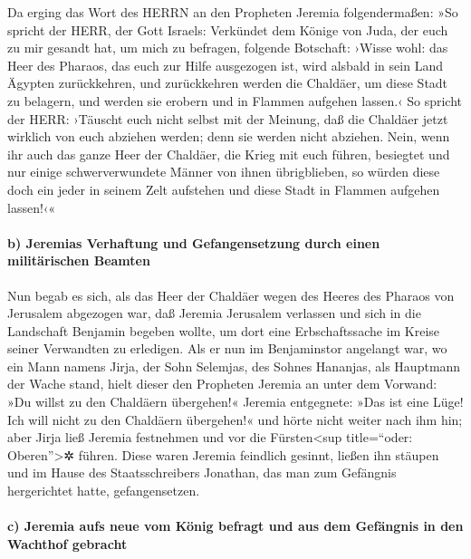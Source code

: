 Da erging das Wort des HERRN an den Propheten Jeremia
folgendermaßen: »So spricht der HERR, der Gott Israels:
Verkündet dem Könige von Juda, der euch zu mir gesandt hat, um mich zu
befragen, folgende Botschaft: ›Wisse wohl: das Heer des Pharaos, das
euch zur Hilfe ausgezogen ist, wird alsbald in sein Land Ägypten
zurückkehren, und zurückkehren werden die Chaldäer, um
diese Stadt zu belagern, und werden sie erobern und in Flammen aufgehen
lassen.‹ So spricht der HERR: ›Täuscht euch nicht selbst
mit der Meinung, daß die Chaldäer jetzt wirklich von euch abziehen
werden; denn sie werden nicht abziehen. Nein, wenn ihr
auch das ganze Heer der Chaldäer, die Krieg mit euch führen, besiegtet
und nur einige schwerverwundete Männer von ihnen übrigblieben, so würden
diese doch ein jeder in seinem Zelt aufstehen und diese Stadt in Flammen
aufgehen lassen!‹«

\hypertarget{b-jeremias-verhaftung-und-gefangensetzung-durch-einen-milituxe4rischen-beamten}{%
\paragraph{b) Jeremias Verhaftung und Gefangensetzung durch einen
militärischen
Beamten}\label{b-jeremias-verhaftung-und-gefangensetzung-durch-einen-milituxe4rischen-beamten}}

Nun begab es sich, als das Heer der Chaldäer wegen des
Heeres des Pharaos von Jerusalem abgezogen war, daß
Jeremia Jerusalem verlassen und sich in die Landschaft Benjamin begeben
wollte, um dort eine Erbschaftssache im Kreise seiner Verwandten zu
erledigen. Als er nun im Benjaminstor angelangt war, wo
ein Mann namens Jirja, der Sohn Selemjas, des Sohnes Hananjas, als
Hauptmann der Wache stand, hielt dieser den Propheten Jeremia an unter
dem Vorwand: »Du willst zu den Chaldäern übergehen!«
Jeremia entgegnete: »Das ist eine Lüge! Ich will nicht zu
den Chaldäern übergehen!« und hörte nicht weiter nach ihm hin; aber
Jirja ließ Jeremia festnehmen und vor die Fürsten\textless sup
title=``oder: Oberen''\textgreater✲ führen. Diese waren
Jeremia feindlich gesinnt, ließen ihn stäupen und im Hause des
Staatsschreibers Jonathan, das man zum Gefängnis hergerichtet hatte,
gefangensetzen.

\hypertarget{c-jeremia-aufs-neue-vom-kuxf6nig-befragt-und-aus-dem-gefuxe4ngnis-in-den-wachthof-gebracht}{%
\paragraph{c) Jeremia aufs neue vom König befragt und aus dem Gefängnis
in den Wachthof
gebracht}\label{c-jeremia-aufs-neue-vom-kuxf6nig-befragt-und-aus-dem-gefuxe4ngnis-in-den-wachthof-gebracht}}

